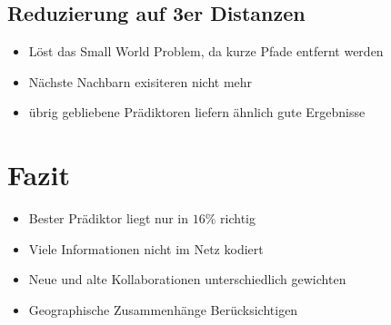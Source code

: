 \documentclass[12pt,titlepage]{beamer}
\begin{document}
	\subsection{Reduzierung auf 3er Distanzen}
	\begin{frame}
	\begin{itemize}
	\item Löst das Small World Problem, da kurze Pfade entfernt werden
	\item Nächste Nachbarn exisiteren nicht mehr
	\item übrig gebliebene Prädiktoren liefern ähnlich gute Ergebnisse
	\end{itemize}
	
	\end{frame}
	\section{Fazit}
	\begin{frame}
	\begin{itemize}
	\item Bester Prädiktor liegt nur in $16\%$ richtig
	\item Viele Informationen nicht im Netz kodiert
	\item Neue und alte Kollaborationen unterschiedlich gewichten
	\item Geographische Zusammenhänge Berücksichtigen
	\end{itemize}
	
	\end{frame}
	
	
	
	
	
	

	


	
\end{document}
